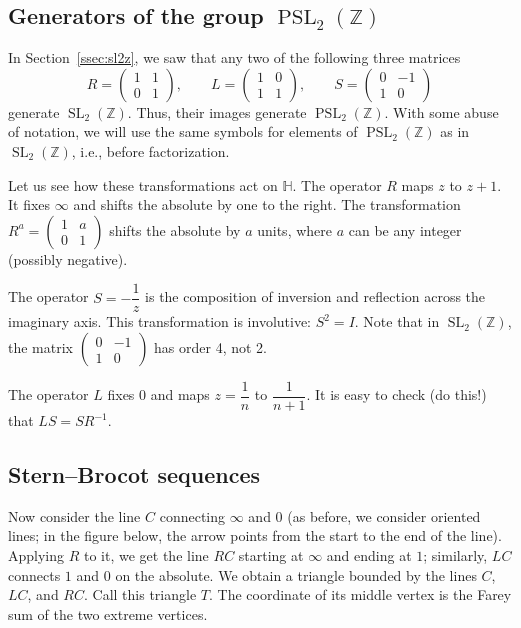 \documentclass[a4paper,11pt]{amsart}
\newcommand{\HH}{{\mathbb{H}}}
\newcommand{\ZZ}{{\mathbb{Z}}}
\newcommand{\SL}{\mathop{\mathrm{SL}}}
\newcommand{\PSL}{\mathop{\mathrm{PSL}}}
\theoremstyle{plain}
\theoremstyle{remark}
\theoremstyle{definition}
\numberwithin{equation}{section}
\numberwithin{figure}{section}
\begin{document}
\subsection{Generators of the group $\PSL_2(\ZZ)$}

In Section~\ref{ssec:sl2z}, we saw that any two of the following three matrices
\[
R=\begin{pmatrix}1 & 1\\ 0 &1
\end{pmatrix},\qquad
L=\begin{pmatrix}1 & 0\\ 1 &1
\end{pmatrix},\qquad
S=\begin{pmatrix}0 & -1\\ 1 &0
\end{pmatrix}
\]
generate $\SL_2(\ZZ)$. Thus, their images generate $\PSL_2(\ZZ)$. With some abuse of notation, we will use the same symbols for elements of $\PSL_2(\ZZ)$ as in $\SL_2(\ZZ)$, i.e., before factorization.

Let us see how these transformations act on $\HH$. The operator $R$ maps $z$ to $z+1$. It fixes $\infty$ and shifts the absolute by one to the right. The transformation $R^a=\begin{pmatrix}1&a\\0&1\end{pmatrix}$ shifts the absolute by $a$ units, where $a$ can be any integer (possibly negative).

The operator $S=-\dfrac 1z$ is the composition of inversion and reflection across the imaginary axis. This transformation is involutive: $S^2=I$. Note that in $\SL_2(\ZZ)$, the matrix $\begin{pmatrix}0&-1\\1&0\end{pmatrix}$ has order 4, not 2.

The operator $L$ fixes $0$ and maps $z=\dfrac 1n$ to $\dfrac 1{n+1}$. It is easy to check (do this!) that $LS=SR^{-1}$.

\subsection{Stern--Brocot sequences}

Now consider the line $C$ connecting $\infty$ and $0$ (as before, we consider oriented lines; in the figure below, the arrow points from the start to the end of the line). Applying $R$ to it, we get the line $RC$ starting at $\infty$ and ending at $1$; similarly, $LC$ connects $1$ and $0$ on the absolute. We obtain a triangle bounded by the lines $C$, $LC$, and $RC$. Call this triangle $T$. The coordinate of its middle vertex is the Farey sum of the two extreme vertices.
\end{document}
